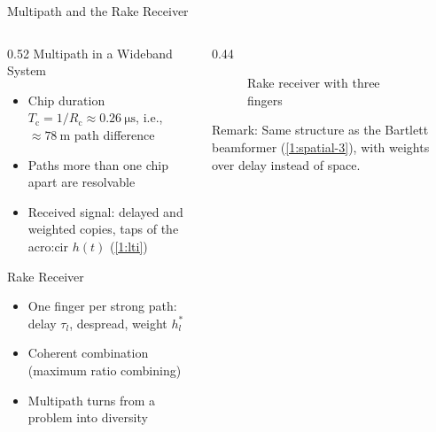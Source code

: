 \begin{frame}{Multipath and the Rake Receiver}
  \begin{columns}[T,onlytextwidth]
    \begin{column}{0.52\textwidth}
      Multipath in a Wideband System
      \begin{itemize}
        \item Chip duration $T_\mathrm{c} = 1/R_\mathrm{c} \approx \qty{0.26}{\micro\second}$, i.e., $\approx\qty{78}{\meter}$ path difference
        \item Paths more than one chip apart are resolvable
        \item Received signal: delayed and weighted copies, taps of the \gls{acro:cir} $h(t)$ (\cref{1:lti})
      \end{itemize}
      \vspace{0.4em}
      Rake Receiver
      \begin{itemize}
        \item One finger per strong path: delay $\tau_l$, despread, weight $h_l^*$
        \item Coherent combination (maximum ratio combining)
        \item Multipath turns from a problem into diversity
      \end{itemize}
    \end{column}
    \begin{column}{0.44\textwidth}
      \begin{figure}
        \centering
        \resizebox{\linewidth}{!}{}
        \caption{Rake receiver with three fingers}
      \end{figure}
      \alert{Remark:} Same structure as the Bartlett beamformer (\cref{1:spatial-3}), with weights over delay instead of space.
    \end{column}
  \end{columns}
\end{frame}

